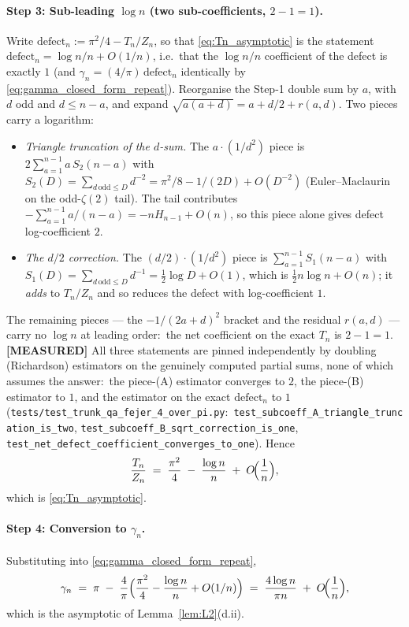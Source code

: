 \documentclass[11pt,a4paper]{article}
\theoremstyle{plain}
\theoremstyle{definition}
\begin{document}
\paragraph{Step 3: Sub-leading $\log n$ (two sub-coefficients, $2 - 1 = 1$).}
Write $\mathrm{defect}_n := \pi^2/4 - T_n/Z_n$, so that
\eqref{eq:Tn_asymptotic} is the statement $\mathrm{defect}_n = \log n/n
+ O(1/n)$, i.e.\ that the $\log n / n$ coefficient of the defect is
exactly $1$ (and $\gamma_n = (4/\pi)\,\mathrm{defect}_n$ identically by
\eqref{eq:gamma_closed_form_repeat}). Reorganise the Step-1 double
sum by $a$, with $d$ odd and $d \le n - a$, and expand
$\sqrt{a(a+d)} = a + d/2 + r(a,d)$. Two pieces carry a logarithm:
\begin{itemize}
\item[(A)] \emph{Triangle truncation of the $d$-sum.} The
$a\cdot(1/d^2)$ piece is $2\sum_{a=1}^{n-1} a\,S_2(n-a)$ with
$S_2(D) = \sum_{d\,\mathrm{odd}\le D} d^{-2} = \pi^2/8 - 1/(2D) +
O(D^{-2})$ (Euler--Maclaurin on the odd-$\zeta(2)$ tail). The tail
contributes $-\sum_{a=1}^{n-1} a/(n-a) = -n H_{n-1} + O(n)$, so this
piece alone gives defect log-coefficient $2$.
\item[(B)] \emph{The $d/2$ correction.} The $(d/2)\cdot(1/d^2)$ piece is
$\sum_{a=1}^{n-1} S_1(n-a)$ with $S_1(D) = \sum_{d\,\mathrm{odd}\le D}
d^{-1} = \tfrac12\log D + O(1)$, which is $\tfrac12 n\log n + O(n)$; it
\emph{adds} to $T_n/Z_n$ and so reduces the defect with log-coefficient
$1$.
\end{itemize}
The remaining pieces --- the $-1/(2a+d)^2$ bracket and the residual
$r(a,d)$ --- carry no $\log n$ at leading order:\ the net coefficient
on the exact $T_n$ is $2 - 1 = 1$. \textbf{[MEASURED]} All three
statements are pinned independently by doubling (Richardson)
estimators on the genuinely computed partial sums, none of which
assumes the answer:\ the piece-(A) estimator converges to $2$, the
piece-(B) estimator to $1$, and the estimator on the exact
$\mathrm{defect}_n$ to $1$
(\texttt{tests/test\_trunk\_qa\_fejer\_4\_over\_pi.py}:\
\texttt{test\_subcoeff\_A\_triangle\_truncation\_is\_two},
\texttt{test\_subcoeff\_B\_sqrt\_correction\_is\_one},
\texttt{test\_net\_defect\_coefficient\_converges\_to\_one}). Hence
\begin{equation*}
   \frac{T_n}{Z_n} \;=\; \frac{\pi^2}{4} \;-\; \frac{\log n}{n}
   \;+\; O\!\Bigl(\frac{1}{n}\Bigr),
\end{equation*}
which is \eqref{eq:Tn_asymptotic}.

\paragraph{Step 4: Conversion to $\gamma_n$.}
Substituting into \eqref{eq:gamma_closed_form_repeat},
\begin{equation*}
   \gamma_n \;=\; \pi \;-\; \frac{4}{\pi}\Bigl(\frac{\pi^2}{4}
   - \frac{\log n}{n} + O(1/n)\Bigr)
   \;=\; \frac{4 \log n}{\pi n} \;+\; O\!\Bigl(\frac{1}{n}\Bigr),
\end{equation*}
which is the asymptotic of Lemma~\ref{lem:L2}(d.ii).
\end{document}
